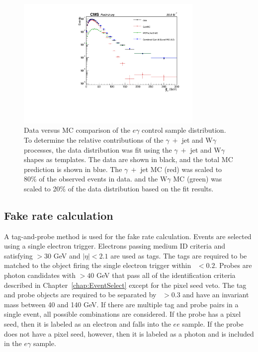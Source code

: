 \begin{figure}[h!]
	\centering
	\includegraphics[width=0.8\textwidth]{Figures/DataAnalysis/dataMC_EG.pdf}
       \caption{Data versus MC comparison of the $e\gamma$ control sample \ETmiss distribution. To determine the relative contributions of the
       $\gamma~+$ jet and W$\gamma$ processes, the data distribution was fit using the $\gamma~+$ jet and W$\gamma$ shapes as templates. The data
       are shown in black, and the total MC prediction is shown in blue. The $\gamma~+$ jet MC (red) was scaled to 80\% of the observed events in data. and 
       the W$\gamma$ MC (green) was scaled to 20\% of the data distribution based on the fit results.
	}
   	\label{fig:dataMCEG}
\end{figure}


\subsection{Fake rate calculation}
\label{sec:fakeRate}

A tag-and-probe method is used for the fake rate calculation. Events are selected using a single electron trigger. Electrons passing medium ID criteria and 
satisfying \pT $> 30$ GeV and $|\eta| < 2.1$ are used as tags. The tags are required to be matched to the object firing the single electron trigger within \dR~$ < 0.2$. 
Probes are photon candidates with \pT $> 40$ GeV that pass all of the identification criteria described in Chapter~\ref{chap:EventSelect} except for the pixel seed veto. The tag and probe objects are required to be separated by \dR~$ > 0.3$ and have an invariant mass between 40 and 140 GeV. If there are multiple tag and probe pairs in a single event, all possible combinations are considered. If the probe has a pixel seed, then it is labeled as an electron and falls into the $ee$ sample. If the probe does not have a pixel seed, however, then it is labeled as a photon and is included in the $e\gamma$ sample. 

